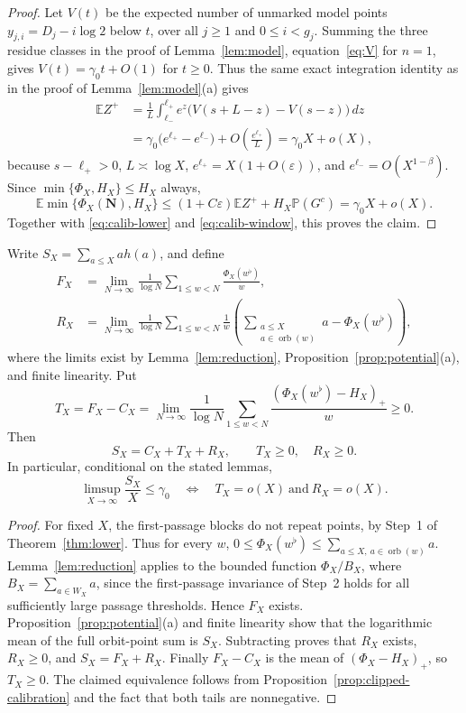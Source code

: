 \begin{proof}
Let $V(t)$ be the expected number of unmarked model points
$y_{j,i}=D_j-i\log2$ below $t$, over all $j\ge1$ and
$0\le i<g_j$. Summing the three residue classes in the proof of
Lemma~\ref{lem:model}, equation~\eqref{eq:V} for $n=1$, gives
$V(t)=\gamma_0t+O(1)$ for $t\ge0$. Thus the same exact
integration identity as in the proof of Lemma~\ref{lem:model}(a)
gives
\[
 \begin{aligned}
 \mathbb EZ^+
 &=\frac1L\int_{\ell_-}^{\ell_+}e^z
             \bigl(V(s+L-z)-V(s-z)\bigr)\,dz\\
 &=\gamma_0\bigl(e^{\ell_+}-e^{\ell_-}\bigr)
       +O\left(\frac{e^{\ell_+}}L\right)
  =\gamma_0 X+o(X),
 \end{aligned}
\]
because $s-\ell_+>0$, $L\asymp\log X$,
$e^{\ell_+}=X(1+O(\varepsilon))$, and
$e^{\ell_-}=O(X^{1-\beta})$.
Since $\min\{\Phi_X,H_X\}\le H_X$ always,
\[
 \mathbb E\min\{\Phi_X(\mathbf N),H_X\}
 \le(1+C\varepsilon)\mathbb EZ^+
     +H_X\mathbb P(G^c)
 =\gamma_0X+o(X).
\]
Together with \eqref{eq:calib-lower} and
\eqref{eq:calib-window}, this proves the claim.
\end{proof}

\begin{corollary}
\label{cor:two-tails}
Write $S_X=\sum_{a\le X}a h(a)$, and define
\[
\begin{aligned}
 F_X&=\lim_{N\to\infty}\frac1{\log N}
   \sum_{1\le w<N}\frac{\Phi_X(w^\flat)}w,\\
 R_X&=\lim_{N\to\infty}\frac1{\log N}
   \sum_{1\le w<N}\frac1w
   \left(\sum_{\substack{a\le X\\a\in\operatorname{orb}(w)}}a
   -\Phi_X(w^\flat)\right),
\end{aligned}
\]
where the limits exist by Lemma~\ref{lem:reduction},
Proposition~\ref{prop:potential}(a), and finite linearity.
Put
\[
 T_X=F_X-C_X
 =\lim_{N\to\infty}\frac1{\log N}
     \sum_{1\le w<N}\frac{(\Phi_X(w^\flat)-H_X)_+}{w}\ge0.
\]
Then
\[
 \boxed{S_X=C_X+T_X+R_X,\qquad T_X\ge0,\quad R_X\ge0.}
\]
In particular, conditional on the stated lemmas,
\[
 \limsup_{X\to\infty}\frac{S_X}{X}\le\gamma_0
 \quad\Longleftrightarrow\quad T_X=o(X)\ \text{and}\ R_X=o(X).
\]
\end{corollary}
\begin{proof}
For fixed $X$, the first-passage blocks do not repeat points,
by Step~1 of Theorem~\ref{thm:lower}. Thus for every $w$,
$0\le\Phi_X(w^\flat)\le
\sum_{a\le X,\ a\in\operatorname{orb}(w)}a$.
Lemma~\ref{lem:reduction} applies to the bounded function
$\Phi_X/B_X$, where $B_X=\sum_{a\in W_X}a$, since the first-passage
invariance of Step~2 holds for all sufficiently large passage
thresholds. Hence $F_X$ exists. Proposition~\ref{prop:potential}(a)
and finite linearity show that the logarithmic mean of the full
orbit-point sum is $S_X$. Subtracting proves that $R_X$ exists,
$R_X\ge0$, and $S_X=F_X+R_X$.
Finally $F_X-C_X$ is the mean of $(\Phi_X-H_X)_+$, so $T_X\ge0$. The claimed equivalence follows
from Proposition~\ref{prop:clipped-calibration} and the fact that
both tails are nonnegative.
\end{proof}

